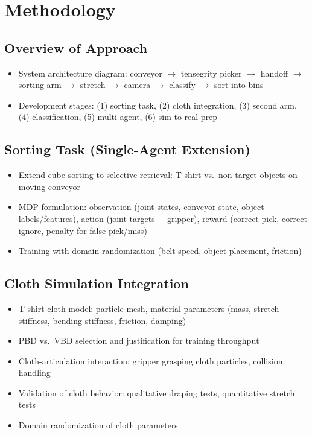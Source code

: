 \chapter{Methodology}\label{ch:methodology}

\section{Overview of Approach}
\begin{itemize}
    \item System architecture diagram: conveyor $\rightarrow$ tensegrity picker $\rightarrow$ handoff $\rightarrow$ sorting arm $\rightarrow$ stretch $\rightarrow$ camera $\rightarrow$ classify $\rightarrow$ sort into bins
    \item Development stages: (1) sorting task, (2) cloth integration, (3) second arm, (4) classification, (5) multi-agent, (6) sim-to-real prep
\end{itemize}

\section{Sorting Task (Single-Agent Extension)}
\begin{itemize}
    \item Extend cube sorting to selective retrieval: T-shirt vs.\ non-target objects on moving conveyor
    \item MDP formulation: observation (joint states, conveyor state, object labels/features), action (joint targets + gripper), reward (correct pick, correct ignore, penalty for false pick/miss)
    \item Training with domain randomization (belt speed, object placement, friction)
\end{itemize}

\section{Cloth Simulation Integration}
\begin{itemize}
    \item T-shirt cloth model: particle mesh, material parameters (mass, stretch stiffness, bending stiffness, friction, damping)
    \item PBD vs.\ VBD selection and justification for training throughput
    \item Cloth-articulation interaction: gripper grasping cloth particles, collision handling
    \item Validation of cloth behavior: qualitative draping tests, quantitative stretch tests
    \item Domain randomization of cloth parameters
\end{itemize}

